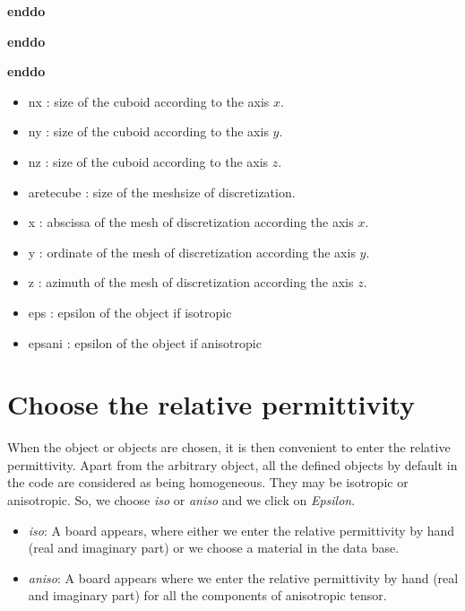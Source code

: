     \hspace{15mm} {\bf enddo}

  \hspace{10mm} {\bf enddo}

 \hspace{5mm} {\bf enddo}


\vspace{10mm}

\begin{itemize}
\item nx : size of the cuboid according to the axis $x$.
\item ny : size of the cuboid according to the axis $y$.
\item nz : size of the cuboid according to the axis $z$.
\item aretecube : size of the meshsize of discretization. 
\item x : abscissa of the mesh of discretization according the axis
  $x$.
\item y : ordinate of the mesh of discretization according the axis
  $y$.
\item z : azimuth of the mesh of discretization according the axis
  $z$.
\item eps : epsilon of the object if isotropic
\item epsani : epsilon of the object if anisotropic
\end{itemize}

\section{Choose the relative permittivity}

When the object or objects are chosen, it is then convenient to enter
the relative permittivity. Apart from the arbitrary object, all the
defined objects by default in the code are considered as being
homogeneous. They may be isotropic or anisotropic. So, we choose {\it
  iso} or {\it aniso} and we click on {\it Epsilon}.

\begin{itemize} 
\item {\it iso}: A board appears, where either we enter the relative
  permittivity by hand (real and imaginary part) or we choose a
  material in the data base.
\item {\it aniso}: A board appears where we enter the relative
  permittivity by hand (real and imaginary part) for all the
  components of anisotropic tensor.
\end{itemize}

